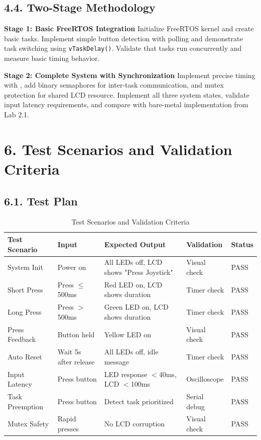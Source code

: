 \documentclass[12pt]{article}
\begin{document}
\subsection*{4.4. Two-Stage Methodology}

\textbf{Stage 1: Basic FreeRTOS Integration}
\newline
Initialize FreeRTOS kernel and create basic tasks. Implement simple button detection with polling and demonstrate task switching using \texttt{vTaskDelay()}. Validate that tasks run concurrently and measure basic timing behavior.

\textbf{Stage 2: Complete System with Synchronization}
\newline
Implement precise timing with , add binary semaphores for inter-task communication, and mutex protection for shared LCD resource. Implement all three system states, validate input latency requirements, and compare with bare-metal implementation from Lab 2.1.

\section*{6. Test Scenarios and Validation Criteria}

\subsection*{6.1. Test Plan}

\begin{table}[H]
	\centering
	\small
	\caption{Test Scenarios and Validation Criteria}
	\label{tab:test-scenarios}
	\begin{tabular}{|p{3cm}|p{2.5cm}|p{2.5cm}|p{2cm}|p{2cm}|}
		\hline
		\textbf{Test Scenario} & \textbf{Input} & \textbf{Expected Output} & \textbf{Validation} & \textbf{Status} \\
		\hline
		System Init & Power on & All LEDs off, LCD shows "Press Joystick" & Visual check & PASS \\
		\hline
		Short Press & Press $\leq$500ms & Red LED on, LCD shows duration & Timer check & PASS \\
		\hline
		Long Press & Press $>$500ms & Green LED on, LCD shows duration & Timer check & PASS \\
		\hline
		Press Feedback & Button held & Yellow LED on & Visual check & PASS \\
		\hline
		Auto Reset & Wait 5s after release & All LEDs off, idle message & Timer check & PASS \\
		\hline
		Input Latency & Press button & LED response $<$40ms, LCD $<$100ms & Oscilloscope & PASS \\
		\hline
		Task Preemption & Press button & Detect task prioritized & Serial debug & PASS \\
		\hline
		Mutex Safety & Rapid presses & No LCD corruption & Visual check & PASS \\
		\hline
	\end{tabular}
\end{table}
\end{document}
